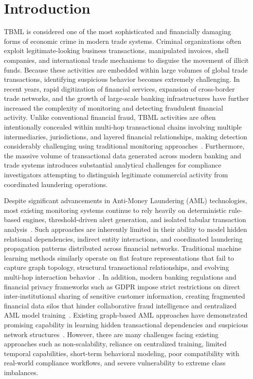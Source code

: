 \documentclass[conference]{IEEEtran}
\begin{document}
\section{\textbf{Introduction}}
TBML is considered one of the most sophisticated and financially damaging forms of economic crime in modern trade systems. Criminal organizations often exploit legitimate-looking business transactions, manipulated invoices, shell companies, and international trade mechanisms to disguise the movement of illicit funds. Because these activities are embedded within large volumes of global trade transactions, identifying suspicious behavior becomes extremely challenging. In recent years, rapid digitization of financial services, expansion of cross-border trade networks, and the growth of large-scale banking infrastructures have further increased the complexity of monitoring and detecting fraudulent financial activity. Unlike conventional financial fraud, TBML activities are often intentionally concealed within multi-hop transactional chains involving multiple intermediaries, jurisdictions, and layered financial relationships, making detection considerably challenging using traditional monitoring approaches~\cite{alsuwaidi2021}. Furthermore, the massive volume of transactional data generated across modern banking and trade systems introduces substantial analytical challenges for compliance investigators attempting to distinguish legitimate commercial activity from coordinated laundering operations.

Despite significant advancements in Anti-Money Laundering (AML) technologies, most existing monitoring systems continue to rely heavily on deterministic rule-based engines, threshold-driven alert generation, and isolated tabular transaction analysis~\cite{oztas2024}. Such approaches are inherently limited in their ability to model hidden relational dependencies, indirect entity interactions, and coordinated laundering propagation patterns distributed across financial networks. Traditional machine learning methods similarly operate on flat feature representations that fail to capture graph topology, structural transactional relationships, and evolving multi-hop interaction behavior~\cite{jensen2023}. In addition, modern banking regulations and financial privacy frameworks such as GDPR impose strict restrictions on direct inter-institutional sharing of sensitive customer information, creating fragmented financial data silos that hinder collaborative fraud intelligence and centralized AML model training~\cite{thommandru2023}. Existing graph-based AML approaches have demonstrated promising capability in learning hidden transactional dependencies and suspicious network structures~\cite{cheng2023, karim2024, li2025}. However, there are many challenges facing existing approaches such as non-scalability, reliance on centralized training, limited temporal capabilities, short-term behavioral modeling, poor compatibility with real-world compliance workflows, and severe vulnerability to extreme class imbalances.
\end{document}
